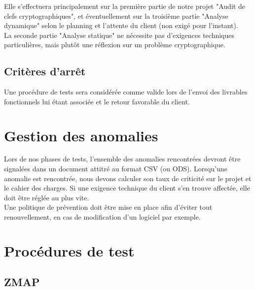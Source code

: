 \documentclass[a4paper,11pt,french]{article}
\begin{document}
Elle s'effectuera principalement sur la première partie de notre projet "Audit de clefs cryptographiques", et éventuellement sur la troisième partie "Analyse dynamique" selon le planning et l'attente du client (non exigé pour l'instant).\\

La seconde partie "Analyse statique" ne nécessite pas d'exigences techniques particulières, mais plutôt une réflexion sur un problème cryptographique.

\subsection{Critères d'arrêt}

Une procédure de tests sera considérée comme valide lors de l'envoi des livrables fonctionnels lui étant associée et le retour favorable du client.


\section{Gestion des anomalies}

Lors de nos phases de tests, l'ensemble des anomalies rencontrées devront être signalées dans un document attitré au format CSV (ou ODS). Lorsqu'une anomalie est rencontrée, nous devons calculer son taux de criticité sur le projet et le cahier des charges. Si une exigence technique du client s'en trouve affectée, elle doit être réglée au plus vite.\\

Une politique de prévention doit être mise en place afin d'éviter tout renouvellement, en cas de modification d'un logiciel par exemple.



\section{Procédures de test}
\subsection{ZMAP}
\end{document}
